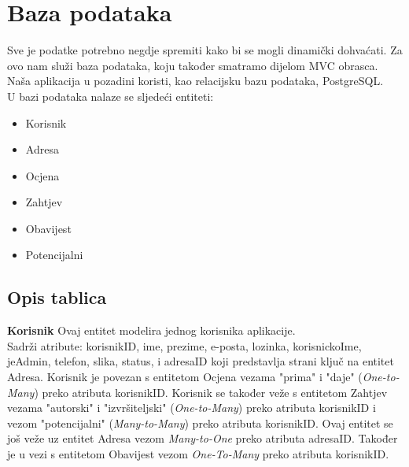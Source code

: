 			
			
			\section{Baza podataka}

			Sve je podatke potrebno negdje spremiti kako bi se mogli dinamički dohvaćati. Za ovo nam služi baza podataka, koju također smatramo dijelom MVC obrasca. Naša aplikacija u pozadini koristi, kao relacijsku bazu podataka, PostgreSQL.
			\\
			U bazi podataka nalaze se sljedeći entiteti:
			\begin{itemize}
				\item Korisnik
				\item Adresa
				\item Ocjena
				\item Zahtjev
				\item Obavijest
				\item Potencijalni
			\end{itemize}
			
			\subsection{Opis tablica}
			
			
			\textbf{Korisnik} Ovaj entitet modelira jednog korisnika aplikacije.\\
			Sadrži atribute: korisnikID, ime, prezime, e-posta, lozinka, korisnickoIme, jeAdmin, telefon, slika, status, i
			adresaID koji predstavlja strani ključ na entitet Adresa. Korisnik je povezan s entitetom Ocjena vezama "prima" i "daje" (\textit{One-to-Many}) preko atributa korisnikID. Korisnik se također veže s entitetom Zahtjev vezama "autorski" i "izvršiteljski" (\textit{One-to-Many}) preko atributa korisnikID i vezom "potencijalni" (\textit{Many-to-Many}) preko atributa korisnikID. Ovaj entitet se još veže uz entitet Adresa vezom \textit{Many-to-One} preko atributa adresaID. Također je u vezi s entitetom Obavijest vezom \textit{One-To-Many} preko atributa korisnikID.
			
